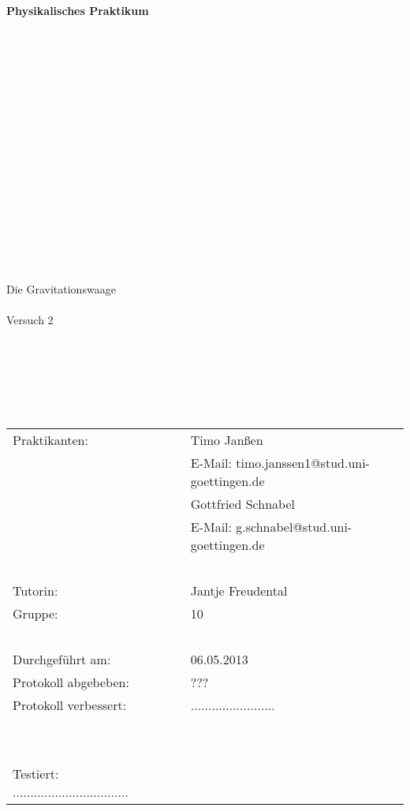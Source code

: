 \begin{center}
    {\Huge{\textbf{Physikalisches Praktikum}}}\\[16pt]
\ \\
\ \\
\ \\
\ \\
\ \\
\ \\
\ \\
\ \\
\ \\
\ \\
\ \\
\ \\
\ \\
\ \\
\ \\
\ \\
\ \\
\huge{Die Gravitationswaage}
\ \\
\ \\
\large{Versuch 2}
\end{center}

\normalsize
\ \\
\ \\
\ \\
\ \\
\ \\

\begin{center}
\begin{tabular}{lcl}
      Praktikanten: & ~ & Timo Janßen \\
                    & ~ & E-Mail: timo.janssen1@stud.uni-goettingen.de \\
		    & ~ & Gottfried Schnabel \\
		    & ~ & E-Mail: g.schnabel@stud.uni-goettingen.de \\
\ \\		    
      Tutorin: & ~ & Jantje Freudental \\
      Gruppe: & ~ & 10 \\
\ \\      
      Durchgeführt am: & ~ & 06.05.2013 \\
      Protokoll abgebeben: & ~ & ??? \\
      Protokoll verbessert: & ~ & ........................\\
\ \\
\ \\
      Testiert: .................................    
\end{tabular}\\
\end{center}
